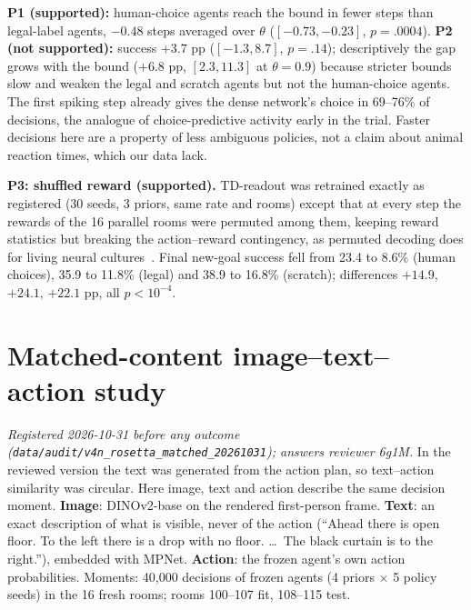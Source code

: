 \documentclass[10pt,onecolumn,letterpaper]{article}
\begin{document}
\textbf{P1 (supported):} human-choice agents reach the bound in fewer steps than legal-label agents, $-0.48$ steps averaged
over $\theta$ ($[-0.73,-0.23]$, $p=.0004$). \textbf{P2 (not supported):} success $+3.7$ pp ($[-1.3,8.7]$, $p=.14$);
descriptively the gap grows with the bound ($+6.8$ pp, $[2.3,11.3]$ at $\theta=0.9$) because stricter bounds slow and
weaken the legal and scratch agents but not the human-choice agents. The first spiking step already gives the dense
network's choice in 69--76\% of decisions, the analogue of choice-predictive activity early in the trial. Faster
decisions here are a property of less ambiguous policies, not a claim about animal reaction times, which our data lack.

\textbf{P3: shuffled reward (supported).} TD-readout was retrained exactly as registered (30 seeds, 3 priors, same rate
and rooms) except that at every step the rewards of the 16 parallel rooms were permuted among them, keeping reward
statistics but breaking the action--reward contingency, as permuted decoding does for living neural
cultures~\cite{zhou2026embodied}. Final new-goal success fell from 23.4 to 8.6\% (human choices), 35.9 to 11.8\%
(legal) and 38.9 to 16.8\% (scratch); differences $+14.9$, $+24.1$, $+22.1$ pp, all $p<10^{-4}$.

\section{Matched-content image--text--action study}
\label{sec:rosetta_matched}
\textit{Registered 2026-10-31 before any outcome (\texttt{data/audit/v4n\_rosetta\_matched\_20261031}); answers reviewer 6g1M.}
In the reviewed version the text was generated from the action plan, so text--action similarity was circular. Here
image, text and action describe the same decision moment. \textbf{Image}: DINOv2-base on the rendered first-person
frame. \textbf{Text}: an exact description of what is visible, never of the action (``Ahead there is open floor. To the
left there is a drop with no floor. \dots\ The black curtain is to the right.''), embedded with MPNet.
\textbf{Action}: the frozen agent's own action probabilities. Moments: 40,000 decisions of frozen agents (4 priors
$\times$ 5 policy seeds) in the 16 fresh rooms; rooms 100--107 fit, 108--115 test.
\end{document}
